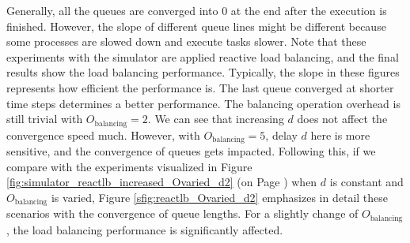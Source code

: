 Generally, all the queues are converged into $0$ at the end after the execution is finished. However, the slope of different queue lines might be different because some processes are slowed down and execute tasks slower. Note that these experiments with the simulator are applied reactive load balancing, and the final results show the load balancing performance. Typically, the slope in these figures represents how efficient the performance is. The last queue converged at shorter time steps determines a better performance. The balancing operation overhead is still trivial with $O_{\text{balancing}}=2$. We can see that increasing $d$ does not affect the convergence speed much. However, with $O_{\text{balancing}}=5$, delay $d$ here is more sensitive, and the convergence of queues gets impacted. Following this, if we compare with the experiments visualized in Figure \ref{fig:simulator_reactlb_increased_Ovaried_d2} (on Page \pageref{fig:simulator_reactlb_increased_Ovaried_d2}) when $d$ is constant and $O_{\text{balancing}}$ is varied, Figure \ref{sfig:reactlb_Ovaried_d2} emphasizes in detail these scenarios with the convergence of queue lengths. For a slightly change of $O_{\text{balancing}}$, the load balancing performance is significantly affected.

